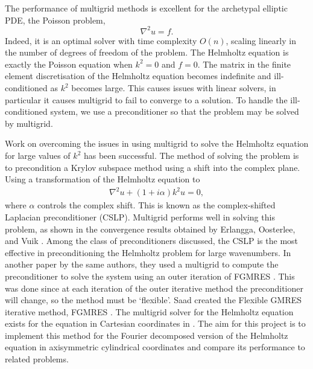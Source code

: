 The performance of multigrid methods is excellent for the archetypal elliptic PDE, the Poisson problem,
\begin{equation}
	\nabla^2 u = f. \label{eqn:poisson}
\end{equation}
Indeed, it is an optimal solver with time complexity $O(n)$, scaling linearly in the number of degrees of freedom of the problem.
The Helmholtz equation is exactly the Poisson equation when $k^2=0$ and $f=0$.
The matrix in the finite element discretisation of the Helmholtz equation becomes indefinite and ill-conditioned as $k^2$ becomes large.
This causes issues with linear solvers, in particular it causes multigrid to fail to converge to a solution.
To handle the ill-conditioned system, we use a preconditioner so that the problem may be solved by multigrid.


Work on overcoming the issues in using multigrid to solve the Helmholtz equation for large values of $k^2$ has been successful.
The method of solving the problem is to precondition a Krylov subspace method using a shift into the complex plane.
Using a transformation of the Helmholtz equation to
\begin{align}
	\nabla^2 u + (1+i\alpha)k^2 u = 0,
\end{align}
where $\alpha$ controls the complex shift.
This is known as the complex-shifted Laplacian preconditioner (CSLP).
Multigrid performs well in solving this problem, as shown in the convergence results obtained by Erlangga, Oosterlee, and Vuik \cite{cslp1}.
Among the class of preconditioners discussed, the CSLP is the most effective in preconditioning the Helmholtz problem for large wavenumbers.
In another paper by the same authors, they used a multigrid to compute the preconditioner to solve the system using an outer iteration of FGMRES \cite{cslp2}.
This was done since at each iteration of the outer iterative method the preconditioner will change, so the method must be `flexible'.
Saad created the Flexible GMRES iterative method, FGMRES \cite{fgmres}.
The multigrid solver for the Helmholtz equation exists for the equation in Cartesian coordinates in \oomph.
The aim for this project is to implement this method for the Fourier decomposed version of the Helmholtz equation in axisymmetric cylindrical coordinates and compare its performance to related problems.






